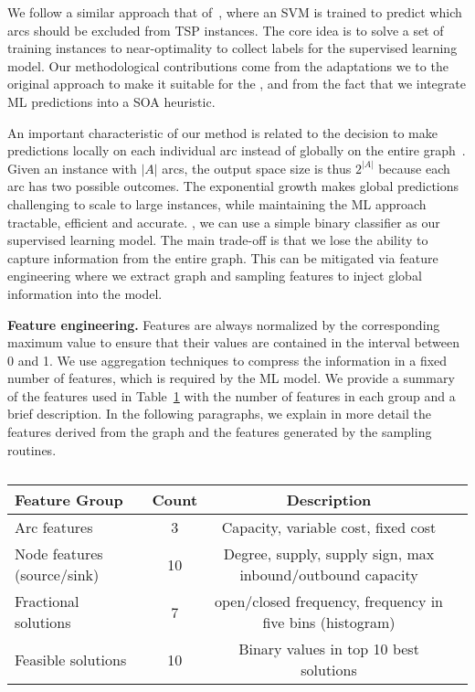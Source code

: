 \documentclass[3p, authoryear, times, doubleblind]{elsarticle}
\begin{document}
{We follow a similar approach that of~\cite{sun_generalization_2021}, where an SVM is trained to predict which arcs should be excluded from TSP instances. The core idea is to solve a set of training instances to near-optimality to collect labels for the supervised learning model.  Our methodological contributions come from the adaptations we  to the original approach to make it suitable for the \fcn, and from the fact that we integrate ML predictions into a SOA heuristic. 


An important characteristic of our method is related to the decision to make predictions locally on each individual arc instead of globally on the entire graph~\citep{liu_machine_2022}. Given an instance with $|A|$ arcs, the output space size is thus $2^{|A|}$ because each arc has two possible outcomes. The exponential growth makes global predictions challenging to scale to large instances, while maintaining the ML approach tractable, efficient and accurate. , we can use a simple binary classifier as our supervised learning model. The main trade-off is that we lose the ability to capture information from the entire graph. This can be mitigated via feature engineering where we extract graph and sampling features to inject global information into the model. 


\startblue 
\textbf{Feature engineering. } Features are always normalized by the corresponding maximum value to ensure that their values are contained in the interval between 0 and 1. We use  aggregation techniques to compress the information in a fixed number of features, which is required by the ML model. We provide a summary of the features used in Table~\ref{tab:fcn:feature_groups} with the number of features in each group and a brief description. In the following paragraphs, we explain in more detail the features derived from the graph and the features generated by the sampling routines.

\begin{table}[h]
\centering
\caption{}
\label{tab:fcn:feature_groups}
\begin{tabular}{lccc}
\toprule
{Feature Group} & {Count} & {Description} \\
\midrule
Arc features & 3 & Capacity, variable cost, fixed cost \\
Node features (source/sink) & 10 & Degree, supply, supply sign, max inbound/outbound capacity \\
Fractional solutions & 7 & open/closed frequency, frequency in five bins (histogram) \\
Feasible solutions & 10 & Binary values in top 10 best solutions  \\
\bottomrule
\end{tabular}
\end{table}


}
\end{document}
